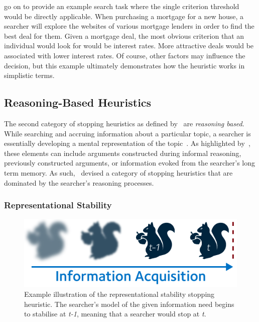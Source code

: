 \cite{browne2005stopping_rules} go on to provide an example search task where the single criterion threshold would be directly applicable. When purchasing a mortgage for a new house, a searcher will explore the websites of various mortgage lenders in order to find the best deal for them. Given a mortgage deal, the most obvious criterion that an individual would look for would be interest rates. More attractive deals would be associated with lower interest rates. Of course, other factors may influence the decision, but this example ultimately demonstrates how the heuristic works in simplistic terms.

\subsection{Reasoning-Based Heuristics}\label{sec:stopping_background:heuristics:reasoning}
The second category of stopping heuristics as defined by~\cite{nickles1995judgment} are \emph{reasoning based}. While searching and accruing information about a particular topic, a searcher is essentially developing a mental representation of the topic~\citep{yates1990decision_making}. As highlighted by~\cite{nickles1995judgment}, these elements can include arguments constructed during informal reasoning, previously constructed arguments, or information evoked from the searcher's long term memory. As such,~\cite{nickles1995judgment} devised a category of stopping heuristics that are dominated by the searcher's reasoning processes.

\subsubsection{Representational Stability}\label{sec:stopping_background:heuristics:representational}
\begin{figure}
    \begin{center}
    \vspace*{-11mm}
    \includegraphics[width=1\textwidth]{figures/ch3-representational.pdf}
    \end{center}
    \vspace*{-5mm}
    \caption[Representational stability stopping heuristic]{Example illustration of the representational stability stopping heuristic. The searcher's model of the given information need begins to stabilise at \emph{t-1}, meaning that a searcher would stop at \emph{t}.}
    \label{fig:representational_heuristic}
\end{figure}

